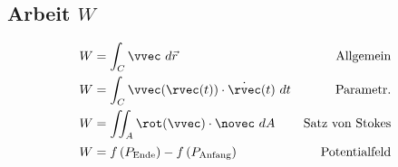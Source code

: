 \subsection{Arbeit \texorpdfstring{\hfill $W$}{W}}
    \vspace{-1em}
    \begin{align*}
        W &= \int_C \vvec \ d \vec{r} &\textrm{Allgemein}\\
        W &= \int_C \vvec(\rvec(t)) \cdot \dot{\rvec}(t) \ dt &\textrm{Parametr.}\\
        W &= \iint_{A} \rot(\vvec) \cdot \novec \ dA & \textrm{Satz von Stokes}\\[0.125em]
        W &= f\left(P_{\textrm{Ende}}\right) - f\left(P_{\textrm{Anfang}}\right) &\textrm{Potentialfeld}
    \end{align*}

